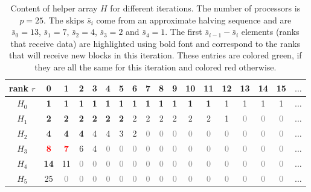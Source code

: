 \begin{table}[]
	\centering
	\begin{tabular}{|c||c|c|c|c|c|c|c|c|c|c|c|c|c|c|c|c|c|} \hline
		rank $r$ &0&1&2&3&4&5&6&7&8&9&10&11&12&13&14&15&$\dots$\\ \hline \hline
		$H_0$&\textbf{\textcolor{OliveGreen}{1}}&\textbf{\textcolor{OliveGreen}{1}}&\textbf{\textcolor{OliveGreen}{1}}&\textbf{\textcolor{OliveGreen}{1}}&\textbf{\textcolor{OliveGreen}{1}}&\textbf{\textcolor{OliveGreen}{1}}&\textbf{\textcolor{OliveGreen}{1}}&\textbf{\textcolor{OliveGreen}{1}}&\textbf{\textcolor{OliveGreen}{1}}&\textbf{\textcolor{OliveGreen}{1}}&\textbf{\textcolor{OliveGreen}{1}}&\textbf{\textcolor{OliveGreen}{1}}&1&1&1&1&$\dots$\\
		$H_1$&\textbf{\textcolor{OliveGreen}{2}}&\textbf{\textcolor{OliveGreen}{2}}&\textbf{\textcolor{OliveGreen}{2}}&\textbf{\textcolor{OliveGreen}{2}}&\textbf{\textcolor{OliveGreen}{2}}&\textbf{\textcolor{OliveGreen}{2}}&2&2&2&2&2&2&1&\textcolor{gray}{0}&\textcolor{gray}{0}&\textcolor{gray}{0}&$\dots$\\
		$H_2$& \textbf{\textcolor{OliveGreen}{4}}&\textbf{\textcolor{OliveGreen}{4}}&\textbf{\textcolor{OliveGreen}{4}}&4&4&3&2&\textcolor{gray}{0}&\textcolor{gray}{0}&\textcolor{gray}{0}&\textcolor{gray}{0}&\textcolor{gray}{0}&\textcolor{gray}{0}&\textcolor{gray}{0}&\textcolor{gray}{0}&\textcolor{gray}{0}&$\dots$\\
		$H_3$& \textbf{\textcolor{red}{8}}&\textbf{\textcolor{red}{7}}&6&4&\textcolor{gray}{0}&\textcolor{gray}{0}&\textcolor{gray}{0}&\textcolor{gray}{0}&\textcolor{gray}{0}&\textcolor{gray}{0}&\textcolor{gray}{0}&\textcolor{gray}{0}&\textcolor{gray}{0}&\textcolor{gray}{0}&\textcolor{gray}{0}&\textcolor{gray}{0}&$\dots$\\
		$H_4$& \textbf{14}&11&\textcolor{gray}{0}&\textcolor{gray}{0}&\textcolor{gray}{0}&\textcolor{gray}{0}&\textcolor{gray}{0}&\textcolor{gray}{0}&\textcolor{gray}{0}&\textcolor{gray}{0}&\textcolor{gray}{0}&\textcolor{gray}{0}&\textcolor{gray}{0}&\textcolor{gray}{0}&\textcolor{gray}{0}&\textcolor{gray}{0}&$\dots$\\
		$H_5$& 25&\textcolor{gray}{0}&\textcolor{gray}{0}&\textcolor{gray}{0}&\textcolor{gray}{0}&\textcolor{gray}{0}&\textcolor{gray}{0}&\textcolor{gray}{0}&\textcolor{gray}{0}&\textcolor{gray}{0}&\textcolor{gray}{0}&\textcolor{gray}{0}&\textcolor{gray}{0}&\textcolor{gray}{0}&\textcolor{gray}{0}&\textcolor{gray}{0}&$\dots$\\\hline
	\end{tabular}
	\caption{Content of helper array $H$ for different iterations. The number of processors is $p=25$. The skips $\bar{s}_i$ come from an approximate halving sequence and are $\bar{s}_0=13$, $\bar{s}_1=7$, $\bar{s}_2=4$, $\bar{s}_3=2$ and $\bar{s}_4=1$. The first $\bar{s}_{i-1}-\bar{s}_i$  elements (ranks that receive data) are highlighted using bold font and correspond to the ranks that will receive new blocks in this iteration. These entries are colored green, if they are all the same for this iteration and colored red otherwise.}
	\label{table:helperArr25}
\end{table}
